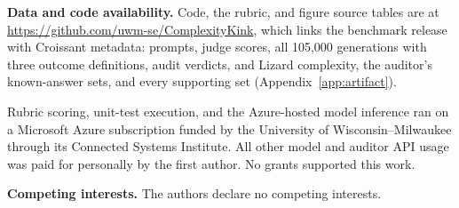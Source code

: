 \documentclass{article}
\newcommand{\codeurl}{\url{https://github.com/uwm-se/ComplexityKink}}
\begin{document}
\vspace{4pt}
\noindent\textbf{Data and code availability.} Code, the rubric, and figure source tables are at \codeurl{}, which links the benchmark release with Croissant metadata: prompts, judge scores, all 105{,}000 generations with three outcome definitions, audit verdicts, and Lizard complexity, the auditor's known-answer sets, and every supporting set (Appendix~\ref{app:artifact}).

\begin{ack}
Rubric scoring, unit-test execution, and the Azure-hosted model inference ran on a Microsoft Azure subscription funded by the University of Wisconsin--Milwaukee through its Connected Systems Institute. All other model and auditor API usage was paid for personally by the first author. No grants supported this work.

\textbf{Competing interests.} The authors declare no competing interests.
\end{ack}
\end{document}
